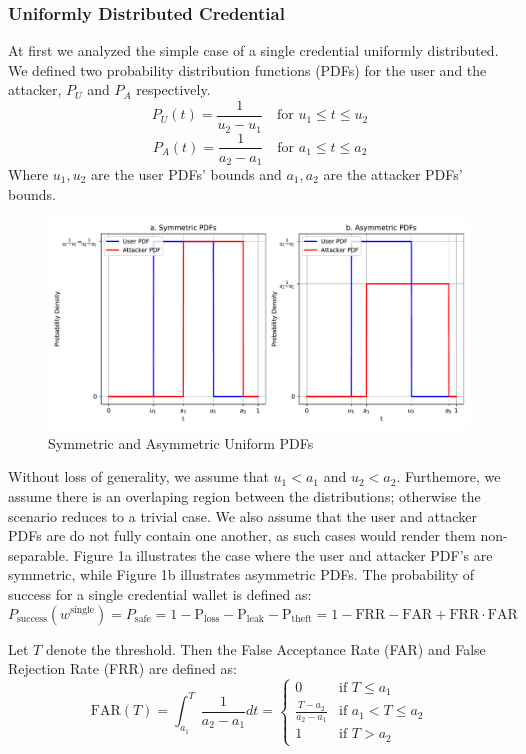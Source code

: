 \documentclass{article}
\begin{document}
\subsubsection{Uniformly Distributed Credential}
At first we analyzed the simple case of a single credential uniformly distributed. 
We defined two probability distribution functions (PDFs) for the user and the attacker, $P_U$ and $P_A$ respectively.
\[
P_U(t) = \frac{1}{u_2-u_1} \quad \text{for } u_1 \leq t \leq u_2
\]
\[
P_A(t) = \frac{1}{a_2-a_1} \quad \text{for } a_1 \leq t \leq a_2
\]
Where $u_1, u_2$ are the user PDFs' bounds and $a_1, a_2$ are the attacker PDFs' bounds. 
\begin{figure}[H]
    \centering
    \includegraphics[width=0.995\textwidth]{fig_uniforms.pdf}
    \caption{Symmetric and Asymmetric Uniform PDFs}
\end{figure}

Without loss of generality, we assume that $u_1 < a_1$ and $u_2 < a_2$. Furthemore, we assume there is an overlaping region between the distributions; otherwise the scenario reduces to a trivial case. We also assume that the user and attacker PDFs are do not fully contain one another, as such cases would render them non-separable. Figure 1a illustrates the case where the user and attacker PDF's are symmetric, while Figure 1b illustrates asymmetric PDFs.
The probability of success for a single credential wallet is defined as:
\[
P_{\text{success}}(w^{\text{single}}) = P_{{\text{safe}}} = 1-\mathrm{P_{\text{loss}}}-\mathrm{P_{\text{leak}}}-\mathrm{P_{\text{theft}}}=1-\mathrm{FRR} - \mathrm{FAR} + \mathrm{FRR} \cdot \mathrm{FAR}
\]

Let $T$ denote the threshold. Then the False Acceptance Rate (FAR) and False Rejection Rate (FRR) are defined as:
\[
\text{FAR}(T) = \int_{a_1}^{T} \frac{1}{a_2-a_1} dt =
\left\{
\begin{array}{ll}
0 & \text{if } T \le a_1 \\
\frac{T-a_2}{a_2 - a_1} & \text{if } a_1 < T \le a_2 \\
1 & \text{if } T > a_2
\end{array}
\right.
\]
\end{document}
